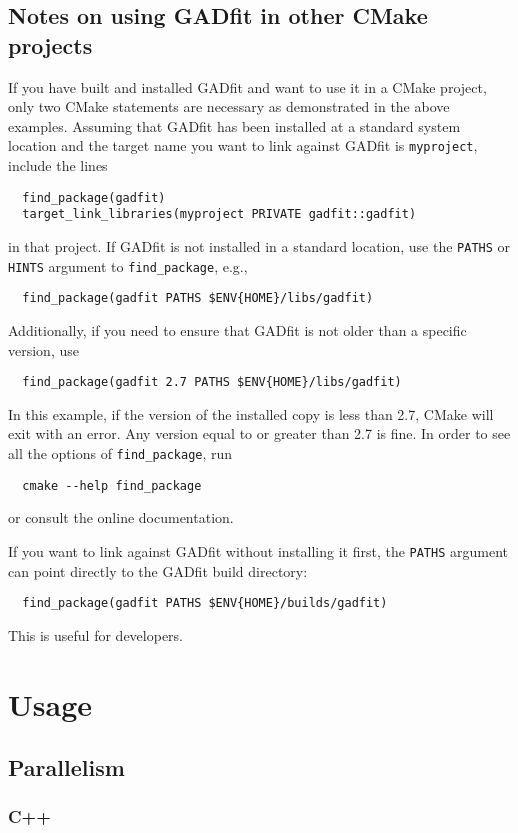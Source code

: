 \documentclass{article}
\begin{document}
\subsection{Notes on using GADfit in other CMake projects}

If you have built and installed GADfit and want to use it in a CMake project, only two CMake statements are necessary as demonstrated in the above examples. Assuming that GADfit has been installed at a standard system location and the target name you want to link against GADfit is \texttt{myproject}, include the lines
\begin{verbatim}
  find_package(gadfit)
  target_link_libraries(myproject PRIVATE gadfit::gadfit)
\end{verbatim}
in that project. If GADfit is not installed in a standard location, use the \texttt{PATHS} or \texttt{HINTS} argument to \verb+find_package+, e.g.,
\begin{verbatim}
  find_package(gadfit PATHS $ENV{HOME}/libs/gadfit)
\end{verbatim}
Additionally, if you need to ensure that GADfit is not older than a specific version, use
\begin{verbatim}
  find_package(gadfit 2.7 PATHS $ENV{HOME}/libs/gadfit)
\end{verbatim}
In this example, if the version of the installed copy is less than 2.7, CMake will exit with an error. Any version equal to or greater than 2.7 is fine. In order to see all the options of \verb+find_package+, run
\begin{verbatim}
  cmake --help find_package
\end{verbatim}
or consult the online documentation.

If you want to link against GADfit without installing it first, the \texttt{PATHS} argument can point directly to the GADfit build directory:
\begin{verbatim}
  find_package(gadfit PATHS $ENV{HOME}/builds/gadfit)
\end{verbatim}
This is useful for developers.

\section{Usage}

\subsection{Parallelism}

\subsubsection{C++}
\end{document}
